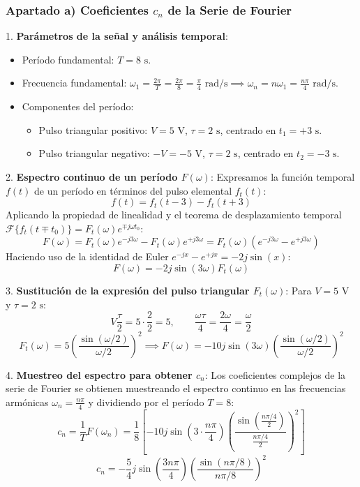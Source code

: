 \begin{resolucion}
\subsubsection*{Apartado a) Coeficientes $c_n$ de la Serie de Fourier}

1. \textbf{Parámetros de la señal y análisis temporal}:
   \begin{itemize}
       \item Período fundamental: $T = 8\text{ s}$.
       \item Frecuencia fundamental: $\omega_1 = \frac{2\pi}{T} = \frac{2\pi}{8} = \frac{\pi}{4}\text{ rad/s} \implies \omega_n = n \omega_1 = \frac{n\pi}{4}\text{ rad/s}$.
       \item Componentes del período:
         \begin{itemize}
             \item Pulso triangular positivo: $V = 5\text{ V}$, $\tau = 2\text{ s}$, centrado en $t_1 = +3\text{ s}$.
             \item Pulso triangular negativo: $-V = -5\text{ V}$, $\tau = 2\text{ s}$, centrado en $t_2 = -3\text{ s}$.
         \end{itemize}
   \end{itemize}

2. \textbf{Espectro continuo de un período $F(\omega)$}:
   Expresamos la función temporal $f(t)$ de un período en términos del pulso elemental $f_t(t)$:
   \[
   f(t) = f_t(t - 3) - f_t(t + 3)
   \]
   Aplicando la propiedad de linealidad y el teorema de desplazamiento temporal $\mathcal{F}\{f_t(t \mp t_0)\} = F_t(\omega) e^{\mp j\omega t_0}$:
   \[
   F(\omega) = F_t(\omega) e^{-j 3 \omega} - F_t(\omega) e^{+j 3 \omega} = F_t(\omega) \left( e^{-j 3 \omega} - e^{+j 3 \omega} \right)
   \]
   Haciendo uso de la identidad de Euler $e^{-jx} - e^{+jx} = -2j \sin(x)$:
   \[
   F(\omega) = -2j \sin(3\omega) F_t(\omega)
   \]

3. \textbf{Sustitución de la expresión del pulso triangular $F_t(\omega)$}:
   Para $V = 5\text{ V}$ y $\tau = 2\text{ s}$:
   \[
   V \frac{\tau}{2} = 5 \cdot \frac{2}{2} = 5, \qquad \frac{\omega\tau}{4} = \frac{2\omega}{4} = \frac{\omega}{2}
   \]
   \[
   F_t(\omega) = 5 \left( \frac{\sin(\omega/2)}{\omega/2} \right)^2 \implies F(\omega) = -10j \sin(3\omega) \left( \frac{\sin(\omega/2)}{\omega/2} \right)^2
   \]

4. \textbf{Muestreo del espectro para obtener $c_n$}:
   Los coeficientes complejos de la serie de Fourier se obtienen muestreando el espectro continuo en las frecuencias armónicas $\omega_n = \frac{n\pi}{4}$ y dividiendo por el período $T = 8$:
   \[
   c_n = \frac{1}{T} F(\omega_n) = \frac{1}{8} \left[ -10j \sin\left(3 \cdot \frac{n\pi}{4}\right) \left( \frac{\sin\left(\frac{n\pi/4}{2}\right)}{\frac{n\pi/4}{2}} \right)^2 \right]
   \]
   \[
   c_n = -\frac{5}{4}j \sin\left(\frac{3n\pi}{4}\right) \left( \frac{\sin(n\pi/8)}{n\pi/8} \right)^2
   \]


\end{resolucion}
